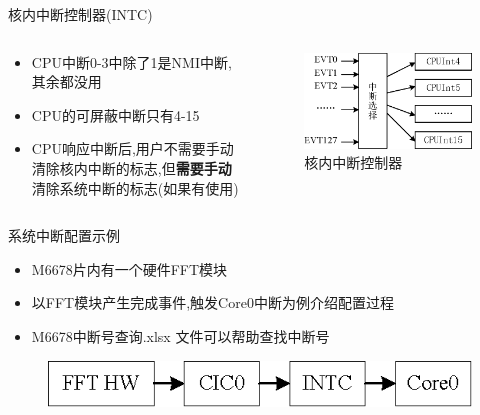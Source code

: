 \documentclass[10pt]{ctexbeamer}
\begin{document}
    \begin{frame}{核内中断控制器(INTC)}
        \begin{columns}
            \begin{column}{0.5\textwidth}
                \begin{itemize}
                    \setlength{\itemsep}{0.5cm}
                    \item CPU中断0-3中除了1是NMI中断,其余都没用
                    \item CPU的可屏蔽中断只有4-15
                    \item CPU响应中断后,用户不需要手动清除核内中断的标志,但\textbf{需要手动}清除系统中断的标志(如果有使用)
                \end{itemize}
            \end{column}
            \begin{column}{0.5\textwidth}
                \begin{figure}
                    \centering
                    \includegraphics[width=\textwidth]{summary/2.eps}
                    \caption{核内中断控制器}
                \end{figure}
            \end{column}
        \end{columns}
    \end{frame}
    
    \begin{frame}{系统中断配置示例}
        \begin{itemize}
            \setlength{\itemsep}{0.5cm}
            \item M6678片内有一个硬件FFT模块
            \item 以FFT模块产生完成事件,触发Core0中断为例介绍配置过程
            \item M6678中断号查询.xlsx 文件可以帮助查找中断号
        \end{itemize}
        \vspace{1cm}
        \begin{figure}
            \centering
            \includegraphics[]{summary/4.eps}
        \end{figure}
    \end{frame}
\end{document}
